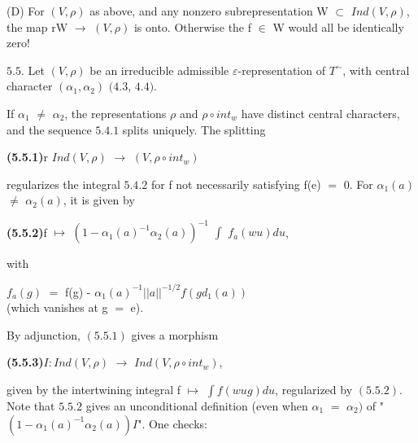 \documentclass[10pt,a4paper]{article}
\begin{document}
\clearpage
{}
\label{d035-physical-023}
\par (D) For $(V,\rho{})$ as above, and any nonzero subrepresentation W $\subset{}$ $Ind(V,\rho{})$, the map rW $\to{}$ $(V,\rho{})$ is onto. Otherwise the f $\in{}$ W would all be identically zero!\par
\par $5.5$. Let $(V,\rho{})$ be an irreducible admissible $\varepsilon{}$-representation of $T^\sim$, with central character $(\alpha{}_1,\alpha{}_2)$ $(4.3$, $4.4)$.\par
\par If $\alpha{}_1$ $\ne{}$ $\alpha{}_2$, the representations $\rho{}$ and $\rho{}∘int_w$ have distinct central characters, and the sequence $5.4.1$ splits uniquely. The splitting\par
\par\noindent\textbf{(5.5.1)}\quad r $Ind(V,\rho{})$ $\to{}$ $(V,\rho{}∘int_w)$\par
\par regularizes the integral $5.4.2$ for f not necessarily satisfying f(e) $=$ 0. For $\alpha{}_1(a)$ $\ne{}$ $\alpha{}_2(a)$, it is given by\par
\par\noindent\textbf{(5.5.2)}\quad f $\mapsto{}$ $(1-\alpha{}_1(a)^{-1}\alpha{}_2(a))^{-1}$ $\int{}$ $f_a(wu)du$,\par
\par with\par
\par\smallskip\begin{center}\begin{minipage}{0.96\textwidth}\centering
$f_a(g)$ $=$ f(g) - $\alpha{}_1(a)^{-1}||a||^{-1/2}f(gd_1(a))$ \\ (which vanishes at g $=$ e).
\end{minipage}\end{center}\smallskip
\par By adjunction, $(5.5.1)$ gives a morphism\par
\par\noindent\textbf{(5.5.3)}\quad $I:Ind(V,\rho{})$ $\to{}$ $Ind(V,\rho{}∘int_w)$,\par
\par given by the intertwining integral f $\mapsto{}$ $\int{}f(wug)du$, regularized by $(5.5.2)$. Note that $5.5.2$ gives an unconditional definition (even when $\alpha{}_1$ $=$ $\alpha{}_2)$ of "$(1-\alpha{}_1(a)^{-1}\alpha{}_2(a))I$". One checks:\par
\end{document}
